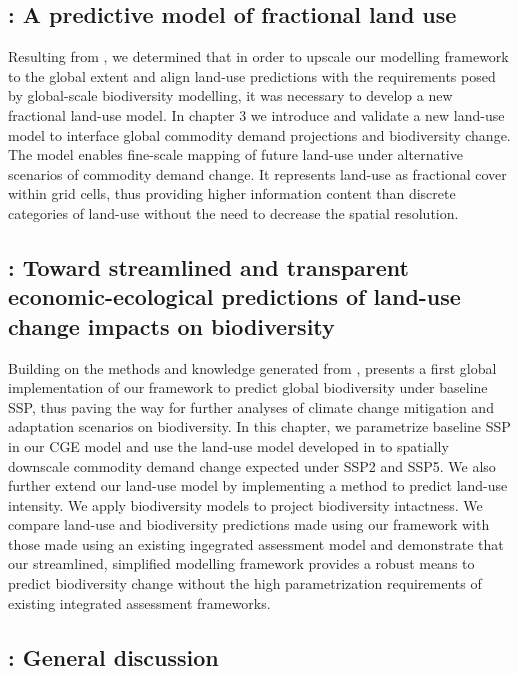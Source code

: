 \documentclass[titlesmallcaps,copyrightpage]{uomthesis}\usepackage[]{graphicx}\usepackage[]{color}
\begin{document}
\subsection*{: A predictive model of fractional land use}
Resulting from , we determined that in order to upscale our modelling framework to the global extent and align land-use predictions with the requirements posed by global-scale biodiversity modelling, it was necessary to develop a new fractional land-use model. In chapter 3 we introduce and validate a new land-use model to interface global commodity demand projections and biodiversity change. The model enables fine-scale mapping of future land-use under alternative scenarios of commodity demand change. It represents land-use as fractional cover within grid cells, thus providing higher information content than discrete categories of land-use without the need to decrease the spatial resolution.

\subsection*{: Toward streamlined and transparent economic-ecological predictions of land-use change impacts on biodiversity}

Building on the methods and knowledge generated from ,  presents a first global implementation of our framework to predict global biodiversity under baseline SSP, thus paving the way for further analyses of climate change mitigation and adaptation scenarios on biodiversity. In this chapter, we parametrize baseline SSP in our CGE model and use the land-use model developed in  to spatially downscale commodity demand change expected under SSP2 and SSP5. We also further extend our land-use model by implementing a method to predict land-use intensity. We apply biodiversity models to project biodiversity intactness. We compare land-use and biodiversity predictions made using our framework with those made using an existing ingegrated assessment model and demonstrate that our streamlined, simplified modelling framework provides a robust means to predict biodiversity change without the high parametrization requirements of existing integrated assessment frameworks.

\subsection*{: General discussion}
\end{document}
